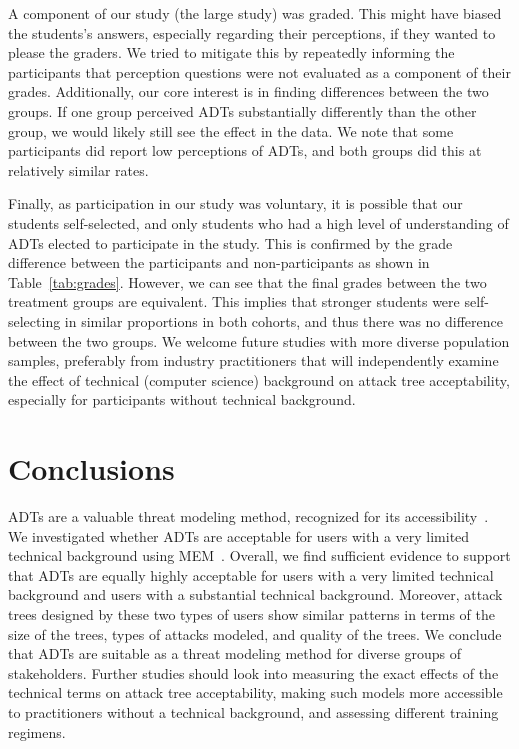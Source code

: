 A component of our study (the large study) was graded. This might have biased the students's answers, especially regarding their perceptions, if they wanted to please the graders. We tried to mitigate this by repeatedly informing the participants that perception questions were not evaluated as a component of their grades. Additionally, our core interest is in finding differences between the two groups. If one group perceived ADTs substantially differently than the other group, we would likely still see the effect in the data. We note that some participants did report low perceptions of ADTs, and both groups did this at relatively similar rates.  

 Finally, as participation in our study was voluntary, it is possible that our students self-selected, and only students who had a high level of understanding of ADTs elected to participate in the study. 
 This is confirmed by the grade difference between the participants and non-participants as shown in Table~\ref{tab:grades}. However, we can see that the final grades between the two treatment groups are equivalent. This implies that stronger students were self-selecting in similar proportions in both cohorts, and thus there was no difference between the two groups. 
  We welcome future studies with more diverse population samples, preferably from industry practitioners that will independently examine the effect of technical (computer science) background on attack tree acceptability, especially for participants without technical background.



\section{Conclusions}\label{sec:conclusions}


ADTs are a valuable threat modeling method, recognized for its accessibility~\cite{shevchenko2018threat,reversinglabs2024attacktrees}.
We investigated whether ADTs are acceptable for users with a very limited technical background using MEM~\cite{moodyMethodEvaluationModel2003}. Overall, we find sufficient evidence to support that ADTs are equally highly acceptable for users with a very limited technical background and users with a substantial technical background. Moreover, attack trees designed by these two types of users show similar patterns in terms of the size of the trees, types of attacks modeled, and quality of the trees. We conclude that ADTs are suitable as a threat modeling method for diverse groups of stakeholders.
Further studies should look into measuring the exact effects of the technical terms on attack tree acceptability, making such models more accessible to practitioners without a technical background, and assessing different training regimens.



